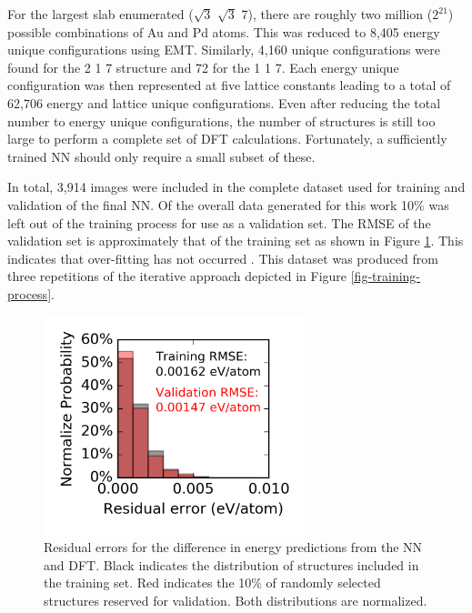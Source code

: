 \documentclass[12pt,oneside]{cmuthesis}
\begin{document}
For the largest slab enumerated (\(\sqrt{3}\) \texttimes{} \(\sqrt{3}\) \texttimes{} 7), there are roughly two million (\(2^{21}\)) possible combinations of Au and Pd atoms. This was reduced to 8,405 energy unique configurations using EMT. Similarly, 4,160 unique configurations were found for the 2 \texttimes{} 1 \texttimes{} 7 structure and 72 for the 1 \texttimes{} 1 \texttimes{} 7. Each energy unique configuration was then represented at five lattice constants leading to a total of 62,706 energy and lattice unique configurations. Even after reducing the total number to energy unique configurations, the number of structures is still too large to perform a complete set of DFT calculations. Fortunately, a sufficiently trained NN should only require a small subset of these.

In total, 3,914 images were included in the complete dataset used for training and validation of the final NN. Of the overall data generated for this work 10\% was left out of the training process for use as a validation set. The RMSE of the validation set is approximately that of the training set as shown in Figure \ref{fig-distribution}. This indicates that over-fitting has not occurred \cite{behler-2015-const}. This dataset was produced from three repetitions of the iterative approach depicted in Figure \ref{fig-training-process}.

\begin{figure}[h]
\centering
\includegraphics[width=3in]{./images/distribution-AuPd.png}
\caption{\label{fig-distribution}
Residual errors for the  difference in energy predictions from the NN and DFT. Black indicates the distribution of structures included in the training set. Red indicates the 10\% of randomly selected structures reserved for validation. Both distributions are normalized.}
\end{figure}
\end{document}

